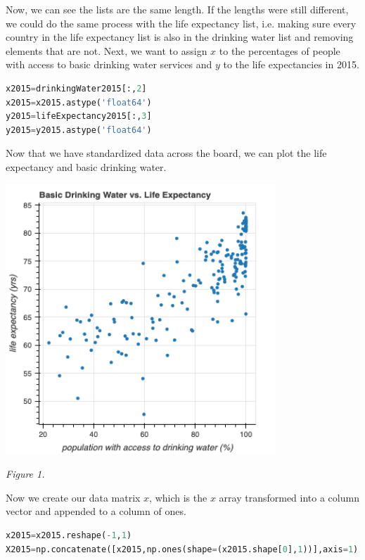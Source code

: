 \documentclass[12pt]{article}
\begin{document}
\noindent
Now, we can see the lists are the same length. If the lengths were still different, we could do the same process with the life expectancy list, i.e. making sure every country in the life expectancy list is also in the drinking water list and removing elements that are not. Next, we want to assign $x$ to the percentages of people with access to basic drinking water services and $y$ to the life expectancies in 2015.
\begin{lstlisting}[language=Python]
x2015=drinkingWater2015[:,2]
x2015=x2015.astype('float64')
y2015=lifeExpectancy2015[:,3]
y2015=y2015.astype('float64')
\end{lstlisting}

\noindent
Now that we have standardized data across the board, we can plot the life expectancy and basic drinking water.

\begin{center}
\includegraphics[width=4in]{Figures/figure1.png}\\
\end{center}

\begin{center}
    \textit{Figure 1.}
\end{center}

\noindent
Now we create our data matrix $x$, which is the $x$ array transformed into a column vector and appended to a column of ones.
\begin{lstlisting}[language=Python]
x2015=x2015.reshape(-1,1)
X2015=np.concatenate([x2015,np.ones(shape=(x2015.shape[0],1))],axis=1)
\end{lstlisting}
\end{document}
